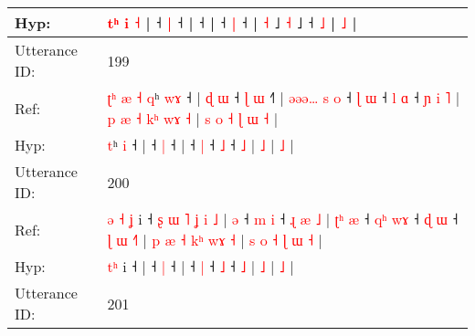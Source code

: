 \documentclass[10pt]{article}
\DeclareRobustCommand{\hl}[1]{{\textcolor{red}{#1}}}
\begin{document}
\begin{longtable}{ll}
 \\
Hyp: & \hl{}\hl{}\hl{}\hl{}\hl{}\hl{t}\hl{ʰ} \hl{i} \hl{˧} |\hl{}\hl{}\hl{}\hl{} ˧\hl{}\hl{}\hl{} \hl{}\hl{|} ˧ |\hl{}\hl{}\hl{}\hl{} ˧\hl{}\hl{}\hl{}\hl{}\hl{}\hl{}\hl{}\hl{}\hl{}\hl{}\hl{}\hl{} |\hl{}\hl{}\hl{}\hl{} ˧\hl{}\hl{}\hl{} \hl{}\hl{|} ˧ | \hl{˧} ˩\hl{}\hl{} \hl{˧} ˩\hl{}\hl{}\hl{}\hl{}\hl{}\hl{} ˧\hl{}\hl{}\hl{}\hl{}\hl{}\hl{} \hl{˩} |\hl{}\hl{}\hl{}\hl{}\hl{}\hl{}\hl{}\hl{}\hl{}\hl{} \hl{˩} |
 \\
\midrule
Utterance ID: & 199 \\
Ref: & \hl{ʈ}\hl{ʰ}\hl{ }\hl{æ}\hl{ }\hl{˧}\hl{ }\hl{q}ʰ \hl{w}\hl{ɤ} ˧ |\hl{ }\hl{ɖ}\hl{ }\hl{ɯ} ˧\hl{ }\hl{ɭ} \hl{ɯ} ˧\hl{˥} |\hl{ }\hl{ə}\hl{ə}\hl{ə}\hl{…}\hl{ }\hl{s}\hl{ }\hl{o} ˧\hl{ }\hl{ɭ} \hl{ɯ} ˧\hl{ }\hl{l} \hl{ɑ} ˧\hl{ }\hl{ɲ}\hl{ }\hl{i} \hl{˥} |\hl{ }\hl{p}\hl{ }\hl{æ}\hl{ }\hl{˧}\hl{ }\hl{k}\hl{ʰ}\hl{ }\hl{w}\hl{ɤ} \hl{˧} |\hl{ }\hl{s}\hl{ }\hl{o}\hl{ }\hl{˧}\hl{ }\hl{ɭ}\hl{ }\hl{ɯ} \hl{˧} |
 \\
Hyp: & \hl{}\hl{}\hl{}\hl{}\hl{}\hl{}\hl{}\hl{t}ʰ \hl{}\hl{i} ˧ |\hl{}\hl{}\hl{}\hl{} ˧\hl{}\hl{} \hl{|} ˧\hl{} |\hl{}\hl{}\hl{}\hl{}\hl{}\hl{}\hl{}\hl{}\hl{} ˧\hl{}\hl{} \hl{|} ˧\hl{}\hl{} \hl{˩} ˧\hl{}\hl{}\hl{}\hl{} \hl{˩} |\hl{}\hl{}\hl{}\hl{}\hl{}\hl{}\hl{}\hl{}\hl{}\hl{}\hl{}\hl{} \hl{˩} |\hl{}\hl{}\hl{}\hl{}\hl{}\hl{}\hl{}\hl{}\hl{}\hl{} \hl{˩} |
 \\
\midrule
Utterance ID: & 200 \\
Ref: & \hl{ə}\hl{ }\hl{˧}\hl{ }\hl{ʝ} i ˧\hl{ }\hl{ʂ}\hl{ }\hl{ɯ}\hl{ }\hl{˥}\hl{ }\hl{ʝ}\hl{ }\hl{i}\hl{ }\hl{˩} |\hl{ }\hl{ə} ˧\hl{ }\hl{m} \hl{i} ˧\hl{ }\hl{ɻ}\hl{ }\hl{æ}\hl{ }\hl{˩} |\hl{ }\hl{ʈ}\hl{ʰ}\hl{ }\hl{æ} ˧\hl{ }\hl{q}\hl{ʰ} \hl{w}\hl{ɤ} ˧\hl{ }\hl{ɖ} \hl{ɯ} ˧\hl{ }\hl{ɭ}\hl{ }\hl{ɯ} \hl{˧}\hl{˥} |\hl{ }\hl{p}\hl{ }\hl{æ}\hl{ }\hl{˧}\hl{ }\hl{k}\hl{ʰ}\hl{ }\hl{w}\hl{ɤ} \hl{˧} |\hl{ }\hl{s}\hl{ }\hl{o}\hl{ }\hl{˧}\hl{ }\hl{ɭ}\hl{ }\hl{ɯ} \hl{˧} |
 \\
Hyp: & \hl{}\hl{}\hl{}\hl{t}\hl{ʰ} i ˧\hl{}\hl{}\hl{}\hl{}\hl{}\hl{}\hl{}\hl{}\hl{}\hl{}\hl{}\hl{} |\hl{}\hl{} ˧\hl{}\hl{} \hl{|} ˧\hl{}\hl{}\hl{}\hl{}\hl{}\hl{} |\hl{}\hl{}\hl{}\hl{}\hl{} ˧\hl{}\hl{}\hl{} \hl{}\hl{|} ˧\hl{}\hl{} \hl{˩} ˧\hl{}\hl{}\hl{}\hl{} \hl{}\hl{˩} |\hl{}\hl{}\hl{}\hl{}\hl{}\hl{}\hl{}\hl{}\hl{}\hl{}\hl{}\hl{} \hl{˩} |\hl{}\hl{}\hl{}\hl{}\hl{}\hl{}\hl{}\hl{}\hl{}\hl{} \hl{˩} |
 \\
\midrule
Utterance ID: & 201 \\

\end{longtable}
\end{document}
